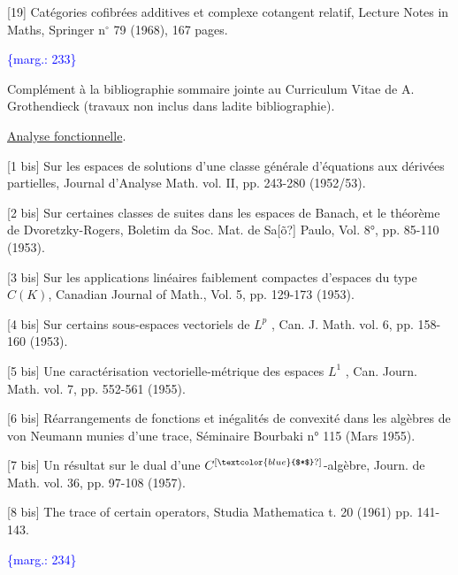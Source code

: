 \documentclass[11pt]{article}
\newcommand{\scanpage}[1]{\par\bigskip\noindent{\small\sffamily[scan #1]}\par}
\newcommand{\mspage}[1]{{\small\sffamily[p.\,#1]}}
\newcommand{\hand}[1]{\textcolor{blue}{#1}}
\newcommand{\margin}[1]{\textcolor{blue}{\{\textsf{marg.:} #1\}}}
\newcommand{\uline}[1]{\underline{#1}}
\newcommand{\unsure}[1]{[#1?]}
\begin{document}
[19] Catégories cofibrées additives et complexe
cotangent relatif, Lecture Notes in Maths,
Springer n$^\circ$ 79 (1968), 167 pages.

\margin{233}

\clearpage
\scanpage{119/234}
\mspage{- 21 -}

Complément à la bibliographie sommaire jointe au
Curriculum Vitae de A. Grothendieck (travaux non inclus
dans ladite bibliographie).

\uline{Analyse fonctionnelle}.

[1 bis] Sur les espaces de solutions d'une classe
générale d'équations aux dérivées partielles,
Journal d'Analyse Math. vol. II, pp. 243-280
(1952/53).

[2 bis] Sur certaines classes de suites dans les espaces
de Banach, et le théorème de Dvoretzky-Rogers,
Boletim da Soc. Mat. de Sa\unsure{\~o} Paulo, Vol. 8°,
pp. 85-110 (1953).

[3 bis] Sur les applications linéaires faiblement
compactes d'espaces du type $C(K)$, Canadian
Journal of Math., Vol. 5, pp. 129-173 (1953).

[4 bis] Sur certains sous-espaces vectoriels de $L^p$ ,
Can. J. Math. vol. 6, pp. 158-160 (1953).

[5 bis] Une caractérisation vectorielle-métrique des
espaces $L^1$ , Can. Journ. Math. vol. 7,
pp. 552-561 (1955).

[6 bis] Réarrangements de fonctions et inégalités de
convexité dans les algèbres de von Neumann
munies d'une trace, Séminaire Bourbaki n° 115
(Mars 1955).

[7 bis] Un résultat sur le dual d'une $C^{\unsure{\hand{$*$}}}$-algèbre,
Journ. de Math. vol. 36, pp. 97-108 (1957).

[8 bis] The trace of certain operators, Studia
Mathematica t. 20 (1961) pp. 141-143.

\margin{234}

\clearpage
\scanpage{119/235}
\mspage{- 22 -}
\end{document}
